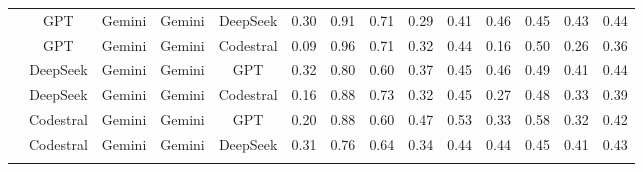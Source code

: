 \documentclass[authoryear,final,5p,times,twocolumn]{elsarticle}
\theoremstyle{plain}
\begin{document}
\begin{table}[p]
{\begin{tabular}{
>{\centering\arraybackslash}l
*{13}{>{\centering\arraybackslash}c}
}
& GPT & Gemini & Gemini & DeepSeek & \cellcolor{red!11}0.30 & \cellcolor{green!16}0.91 & \cellcolor{orange!15}0.71 & \cellcolor{orange!14}0.29 & \cellcolor{green!11}0.41 & \cellcolor{green!11}0.46 & \cellcolor{green!11}0.45 & \cellcolor{red!10}0.43 & \cellcolor{orange!16}0.44 \\
& GPT & Gemini & Gemini & Codestral & \cellcolor{red!20}0.09 & \cellcolor{green!18}0.96 & \cellcolor{orange!15}0.71 & \cellcolor{orange!12}0.32 & \cellcolor{green!12}0.44 & \cellcolor{red!20}0.16 & \cellcolor{green!14}0.50 & \cellcolor{red!20}0.26 & \cellcolor{red!14}0.36 \\
& DeepSeek & Gemini & Gemini & GPT & \cellcolor{red!10}0.32 & \cellcolor{green!13}0.80 & \cellcolor{red!14}0.60 & \cellcolor{green!11}0.37 & \cellcolor{green!13}0.45 & \cellcolor{green!11}0.46 & \cellcolor{green!14}0.49 & \cellcolor{red!11}0.41 & \cellcolor{orange!16}0.44 \\
& DeepSeek & Gemini & Gemini & Codestral & \cellcolor{red!17}0.16 & \cellcolor{green!15}0.88 & \cellcolor{orange!14}0.73 & \cellcolor{orange!12}0.32 & \cellcolor{green!13}0.45 & \cellcolor{red!12}0.27 & \cellcolor{green!13}0.48 & \cellcolor{red!16}0.33 & \cellcolor{red!11}0.39 \\
& Codestral & Gemini & Gemini & GPT & \cellcolor{red!15}0.20 & \cellcolor{green!15}0.88 & \cellcolor{red!14}0.60 & \cellcolor{green!17}0.47 & \cellcolor{green!18}0.53 & \cellcolor{orange!17}0.33 & \cellcolor{green!19}0.58 & \cellcolor{red!16}0.32 & \cellcolor{orange!18}0.42 \\
& Codestral & Gemini & Gemini & DeepSeek & \cellcolor{red!10}0.31 & \cellcolor{green!11}0.76 & \cellcolor{red!11}0.64 & \cellcolor{orange!10}0.34 & \cellcolor{green!12}0.44 & \cellcolor{green!10}0.44 & \cellcolor{green!11}0.45 & \cellcolor{red!11}0.41 & \cellcolor{orange!17}0.43 \\
\addlinespace[1.5ex]
\midrule


\end{tabular}}
\end{table}
\end{document}
